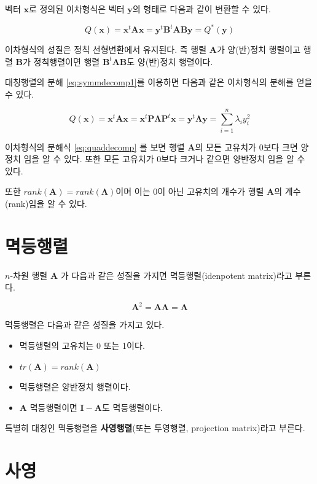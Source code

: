 \documentclass[
]{book}
\providecommand{\tightlist}{%
  \setlength{\itemsep}{0pt}\setlength{\parskip}{0pt}}
\theoremstyle{definition}
\theoremstyle{definition}
\theoremstyle{definition}
\theoremstyle{remark}
\begin{document}
벡터 \(\bm x\)로 정의된 이차형식은 벡터 \(\bm y\)의 형태로 다음과 같이 변환할 수 있다.

\[ Q(\bm x) = \bm x^t \bm A \bm x = \bm y^t \bm B^t \bm A \bm B \bm y =Q^*(\bm y) \]

이차형식의 성질은 정칙 선형변환에서 유지된다. 즉 행렬 \(\bm A\)가 양(반)정치 행렬이고 행렬 \(\bm B\)가 정칙행렬이면 행렬 \(\bm B^t \bm A \bm B\)도 양(반)정치 행렬이다.

대칭행렬의 분해 \eqref{eq:symmdecomp1}를 이용하면 다음과 같은 이차형식의 분해를 얻을 수 있다.

\begin{equation}
Q(\bm x) = \bm x^t \bm A \bm x = \bm x^t \bm P \bm \Lambda \bm P^t \bm x = \bm y^t \bm \Lambda \bm y= \sum_{i=1}^n \lambda_i y_i^2 
\label{eq:quaddecomp}
\end{equation}

이차형식의 분해식 \eqref{eq:quaddecomp} 를 보면 행렬 \(\bm A\)의 모든 고유치가 0보다 크면 양정치 임을 알 수 있다. 또한 모든 고유치가 0보다 크거나 같으면 양반정치 임을 알 수 있다.

또한 \(rank(\bm A) = rank(\bm \Lambda)\)이며 이는 0이 아닌 고유치의 개수가 행렬 \(\bm A\)의 계수(rank)임을 알 수 있다.

\hypertarget{uxba71uxb4f1uxd589uxb82c}{%
\section{멱등행렬}\label{uxba71uxb4f1uxd589uxb82c}}

\(n\)-차원 행렬 \(\bm A\) 가 다음과 같은 성질을 가지면 멱등행렬(idenpotent matrix)라고 부른다.

\[ \bm A^2 = \bm A \bm A = \bm A \]

멱등행렬은 다음과 같은 성질을 가지고 있다.

\begin{itemize}
\tightlist
\item
  멱등행렬의 고유치는 0 또는 1이다.
\item
  \(tr(\bm A) =rank(\bm A)\)
\item
  멱등행렬은 양반정치 행렬이다.
\item
  \(\bm A\) 멱등행렬이면 \(\bm I - \bm A\)도 멱등행렬이다.
\end{itemize}

특별히 대칭인 멱등행렬을 \textbf{사영행렬}(또는 투영행렬, projection matrix)라고 부른다.

\hypertarget{uxc0acuxc601}{%
\section{사영}\label{uxc0acuxc601}}
\end{document}
